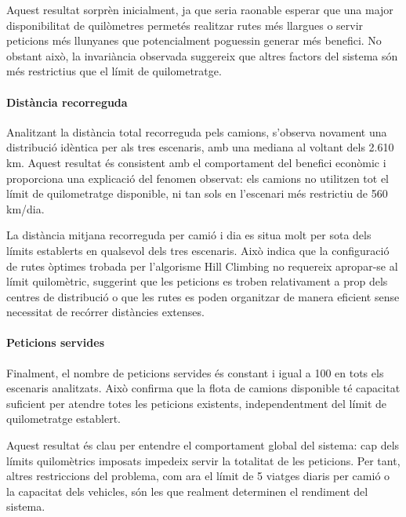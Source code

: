 Aquest resultat sorprèn inicialment, ja que seria raonable esperar que una major disponibilitat de quilòmetres permetés realitzar rutes més llargues o servir peticions més llunyanes que potencialment poguessin generar més benefici. No obstant això, la invariància observada suggereix que altres factors del sistema són més restrictius que el límit de quilometratge.

\paragraph{Distància recorreguda}



Analitzant la distància total recorreguda pels camions, s'observa novament una distribució idèntica per als tres escenaris, amb una mediana al voltant dels 2.610 km. Aquest resultat és consistent amb el comportament del benefici econòmic i proporciona una explicació del fenomen observat: els camions no utilitzen tot el límit de quilometratge disponible, ni tan sols en l'escenari més restrictiu de 560 km/dia.

La distància mitjana recorreguda per camió i dia es situa molt per sota dels límits establerts en qualsevol dels tres escenaris. Això indica que la configuració de rutes òptimes trobada per l'algorisme Hill Climbing no requereix apropar-se al límit quilomètric, suggerint que les peticions es troben relativament a prop dels centres de distribució o que les rutes es poden organitzar de manera eficient sense necessitat de recórrer distàncies extenses.

\paragraph{Peticions servides}



Finalment, el nombre de peticions servides és constant i igual a 100 en tots els escenaris analitzats. Això confirma que la flota de camions disponible té capacitat suficient per atendre totes les peticions existents, independentment del límit de quilometratge establert.

Aquest resultat és clau per entendre el comportament global del sistema: cap dels límits quilomètrics imposats impedeix servir la totalitat de les peticions. Per tant, altres restriccions del problema, com ara el límit de 5 viatges diaris per camió o la capacitat dels vehicles, són les que realment determinen el rendiment del sistema.

